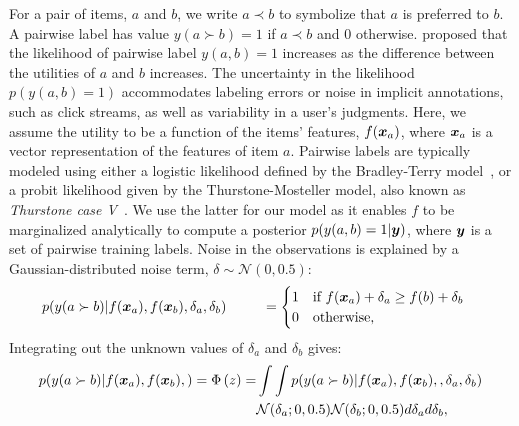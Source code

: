 For a pair of items, $a$ and $b$, we write $a \prec b$ to symbolize that $a$ is preferred to $b$.  
A pairwise label has value $y(a \succ b) =1 $ if $a \prec b$ and $0$ otherwise.
\citet{thurstone1927law} proposed that the likelihood of pairwise label $y(a,b)=1$ 
increases as the difference between the utilities of $a$ and $b$ increases. 
The uncertainty in the likelihood $p(y(a,b)=1)$ accommodates
 labeling errors or noise in implicit annotations, such as click streams, as well as variability in a user's judgments.
Here, we assume the utility to be a function of the items' features,
$f(\boldsymbol x_a)$, where $\boldsymbol x_a$ is a vector representation of the features of item $a$.
Pairwise labels are typically modeled using either a logistic likelihood %
defined by the Bradley-Terry model~\citep{bradley1952rank,plackett1975analysis,luce1959possible},
or a probit likelihood given by the Thurstone-Mosteller model, also known as \emph{Thurstone case V}~\citep{thurstone1927law,mosteller2006remarks}.
We use the latter for our model as it enables $f$ to be marginalized analytically to compute a posterior $p(y(a,b)=1 | \boldsymbol y)$,
where $\boldsymbol y$ is a set of pairwise training labels.
Noise in the observations is explained by a Gaussian-distributed noise term, $\delta \sim \mathcal{N}(0, 0.5)$:
\begin{align}
 p(y(a \succ b) | f(\boldsymbol x_a), f(\boldsymbol x_b), \delta_{a}, \delta_{b} )  
 \hspace{0.9cm} & = \begin{cases}
 1 & \text{if }f(\boldsymbol x_a) + \delta_{a} \geq f(b) + \delta_{b} \\
 0 & \text{otherwise,}
 \end{cases} &
 \label{eq:thurstone}
\end{align}
Integrating out the unknown values of $\delta_a$ and $\delta_b$ gives:
\begin{align}
p( y(a \succ b) | f(\boldsymbol x_a), f(\boldsymbol x_b),  ) 
= \Phi\left( z \right) = & \int\int p( y(a \succ b) | f(\boldsymbol x_a), f(\boldsymbol x_b), , \delta_{a}, \delta_{b} ) \nonumber\\
& \mathcal{N}(\delta_{a}; 0, 0.5)\mathcal{N}(\delta_{b}; 0, 0.5) d\delta_{a} d\delta_{b}, 
\label{eq:plphi}
\end{align}
